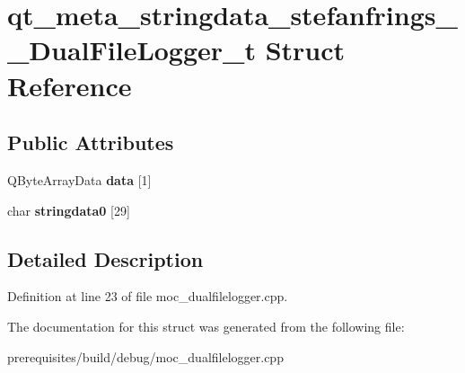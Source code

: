 \hypertarget{structqt__meta__stringdata__stefanfrings_____dual_file_logger__t}{}\section{qt\+\_\+meta\+\_\+stringdata\+\_\+stefanfrings\+\_\+\+\_\+\+Dual\+File\+Logger\+\_\+t Struct Reference}
\label{structqt__meta__stringdata__stefanfrings_____dual_file_logger__t}
\subsection*{Public Attributes}
\begin{DoxyCompactItemize}
\item 
\mbox{\label{structqt__meta__stringdata__stefanfrings_____dual_file_logger__t_a55b600332a334b115697d81c35236464}} 
Q\+Byte\+Array\+Data {\bfseries data} \mbox{[}1\mbox{]}
\item 
\mbox{\label{structqt__meta__stringdata__stefanfrings_____dual_file_logger__t_a0b3787b57f5880901aa5ff6b8543fd00}} 
char {\bfseries stringdata0} \mbox{[}29\mbox{]}
\end{DoxyCompactItemize}


\subsection{Detailed Description}


Definition at line 23 of file moc\+\_\+dualfilelogger.\+cpp.



The documentation for this struct was generated from the following file\+:\begin{DoxyCompactItemize}
\item 
prerequisites/build/debug/moc\+\_\+dualfilelogger.\+cpp\end{DoxyCompactItemize}
